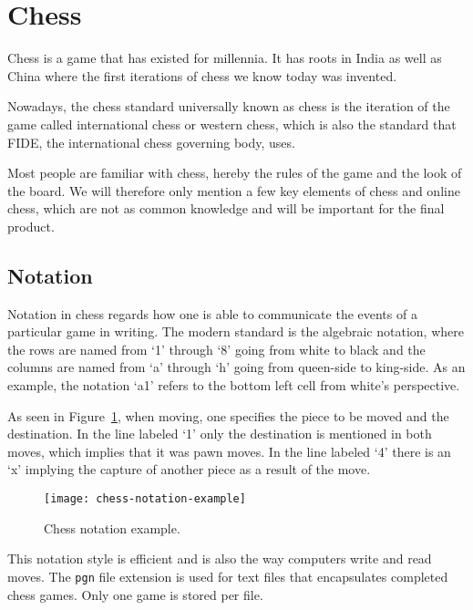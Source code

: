 \section{Chess}\label{sec:chess}

Chess is a game that has existed for millennia.
It has roots in India as well as China where the first iterations of chess we know today was invented. \cite{murray1913}

Nowadays, the chess standard universally known as chess is the iteration of the game called international chess or
western chess, which is also the standard that FIDE, the international chess governing body, uses. \cite{fide2024}

Most people are familiar with chess, hereby the rules of the game and the look of the board.
We will therefore only mention a few key elements of chess and online chess, which are not as common knowledge and will
be important for the final product.

\subsection{Notation}\label{subsec:notation}

Notation in chess regards how one is able to communicate the events of a particular game in writing.
The modern standard is the algebraic notation, where the rows are named from `1' through `8' going from white to black
and the columns are named from `a' through `h' going from queen-side to king-side.
As an example, the notation `a1' refers to the bottom left cell from white's perspective.\cite{pickel2022}

As seen in Figure~\ref{fig:chess-notation-example}, when moving, one specifies the piece to be moved and the
destination.
In the line labeled `1' only the destination is mentioned in both moves, which implies that it was pawn moves.
In the line labeled `4' there is an `x' implying the capture of another piece as a result of the move.

\begin{figure}[h]
    \centering
    \texttt{[image: chess-notation-example]}
    \caption{Chess notation example. \cite{chess.com2024}}
    \label{fig:chess-notation-example}
\end{figure}

This notation style is efficient and is also the way computers write and read moves.
The \lstinline{pgn} file extension is used for text files that encapsulates completed chess games.
Only one game is stored per file. \cite{chess.com2024}

